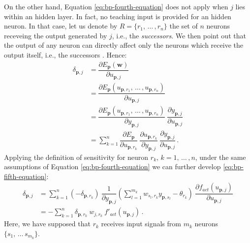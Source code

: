 \documentclass[12pt, a4paper, twoside, openright]{report}
\numberwithin{equation}{chapter}
\theoremstyle{theorem}
\theoremstyle{definition}
\theoremstyle{remark}
\theoremstyle{proposition}
\numberwithin{figure}{chapter}
\begin{document}
		On the other hand, Equation \eqref{eq:bp-fourth-equation} does not apply when $j$ lies within an hidden layer. In fact, no teaching input is provided for an hidden neuron. In that case, let us denote by $R = \big\lbrace r_1, \, \ldots \, , r_n \big\rbrace$ the set of $n$ neurons receveing the output generated by $j$, i.e., the \emph{successors}. We then point out that the output of any neuron can directly affect only the neurons which receive the output itself, i.e., the successors \cite{Kri}. Hence: 
		\begin{equation}
			\label{eq:bp-fifth-equation}
			\begin{aligned}
				\delta_{\boldsymbol{p},j} & = \dfrac{\partial E_{\boldsymbol{p}}(\boldsymbol{w})}{\partial u_{\boldsymbol{p},j}} \\
				& = \dfrac{\partial E_{\boldsymbol{p}}(u_{\boldsymbol{p},r_1}, \, \ldots \, , u_{\boldsymbol{p},r_n})}{\partial u_{\boldsymbol{p},j}} \\
				& = \dfrac{\partial E_{\boldsymbol{p}}(u_{\boldsymbol{p},r_1}, \, \ldots \, , u_{\boldsymbol{p},r_n})}{\partial y_{\boldsymbol{p},j}} ~ \dfrac{\partial y_{\boldsymbol{p},j}}{\partial u_{\boldsymbol{p},j}} \\
				& = \sum_{k = 1}^{n} \dfrac{\partial E_{\boldsymbol{p}}}{\partial u_{\boldsymbol{p},r_k}} ~ \dfrac{\partial u_{\boldsymbol{p},r_k}}{\partial y_{\boldsymbol{p},j}} ~ \dfrac{\partial y_{\boldsymbol{p},j}}{\partial u_{\boldsymbol{p},j}} \, .
			\end{aligned}
		\end{equation}
		Applying the definition of sensitivity for neuron $r_k$, $k = 1, \, \ldots \, , n$, under the same assumptions of Equation \eqref{eq:bp-fourth-equation} we can further develop \eqref{eq:bp-fifth-equation}:
		\begin{equation}
			\label{eq:bp-sixth-equation}
			\begin{aligned}
			\delta_{\boldsymbol{p},j} & = \sum_{k = 1}^n \left( - \delta_{\boldsymbol{p},r_k} \right) ~ \dfrac{1}{\partial y_{\boldsymbol{p},j}} \left( \sum_{l = 1}^{m_k} w_{s_l,r_k} y_{\boldsymbol{p},s_l} - \theta_{r_k} \right) ~ \dfrac{\partial f_{act}(u_{\boldsymbol{p},j})}{\partial u_{\boldsymbol{p},j}} \\
			& = - \sum_{k = 1}^n \delta_{\boldsymbol{p},r_k} ~ w_{j,r_k} ~ f'_{act}(u_{\boldsymbol{p},j}) \, .
			\end{aligned}
		\end{equation}
		Here, we have supposed that $r_k$ receives input signals from $m_k$ neurons $\big\lbrace s_1, \, \ldots \, s_{m_k} \big\rbrace$.
		
\end{document}
